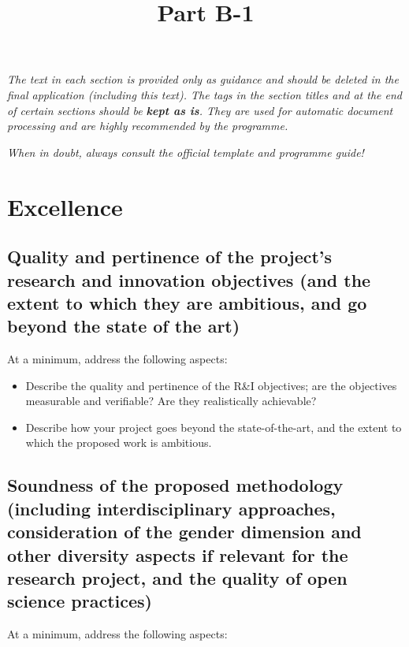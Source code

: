 \documentclass[11pt,draftproposal]{msca-pf}
\title{Part B-1}
\author{}
\date{}
\begin{document}
\maketitle

\textit{The text in each section is provided only as guidance and should be deleted
in the final application (including this text). The tags in the section titles
and at the end of certain sections should be \textbf{kept as is}. They are used for
automatic document processing and are highly recommended by the programme.}

\textit{When in doubt, always consult the official template and programme guide!}

\section{Excellence }

\subsection{
    Quality and pertinence of the project's research and innovation objectives
    (and the extent to which they are ambitious, and go beyond the state of the art)}

At a minimum, address the following aspects:

\begin{itemize}
    \item Describe the quality and pertinence of the R\&I objectives; are the
    objectives measurable and verifiable? Are they realistically achievable?

    \item Describe how your project goes beyond the state-of-the-art, and the
    extent to which the proposed work is ambitious.
\end{itemize}

\subsection{
    Soundness of the proposed methodology
    (including interdisciplinary approaches, consideration of the gender
    dimension and other diversity aspects if relevant for the research project,
    and the quality of open science practices)}

At a minimum, address the following aspects:
\end{document}
